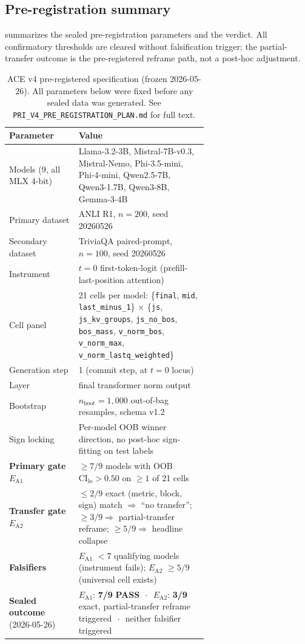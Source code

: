\documentclass[10pt, letterpaper]{article}
\newcommand{\ea}[1]{$E_{\text{A}#1}$}
\begin{document}
\subsection{Pre-registration summary}
\label{sec:results:prereg}

 summarizes the sealed pre-registration
parameters and the verdict. All confirmatory thresholds are cleared
without falsification trigger; the partial-transfer outcome is the
pre-registered reframe path, not a post-hoc adjustment.

\begin{table}[h]
\centering
\caption{ACE v4 pre-registered specification (frozen 2026-05-26).
All parameters below were fixed before any sealed data was generated.
See \texttt{PRI\_V4\_PRE\_REGISTRATION\_PLAN.md} for full text.}
\label{tab:ace_prereg_summary}
\small
\begin{tabular}{@{}lp{0.65\linewidth}@{}}
\toprule
\textbf{Parameter} & \textbf{Value} \\
\midrule
Models (9, all MLX 4-bit) & Llama-3.2-3B, Mistral-7B-v0.3, Mistral-Nemo, Phi-3.5-mini, Phi-4-mini, Qwen2.5-7B, Qwen3-1.7B, Qwen3-8B, Gemma-3-4B \\
Primary dataset & ANLI R1, $n=200$, seed 20260526 \\
Secondary dataset & TriviaQA paired-prompt, $n=100$, seed 20260526 \\
Instrument & $t{=}0$ first-token-logit (prefill-last-position attention) \\
Cell panel & 21 cells per model: \{\texttt{final}, \texttt{mid}, \texttt{last\_minus\_1}\} $\times$ \{\texttt{js}, \texttt{js\_kv\_groups}, \texttt{js\_no\_bos}, \texttt{bos\_mass}, \texttt{v\_norm\_bos}, \texttt{v\_norm\_max}, \texttt{v\_norm\_lastq\_weighted}\} \\
Generation step & 1 (commit step, at $t{=}0$ locus) \\
Layer & final transformer norm output \\
Bootstrap & $n_{\text{boot}}=1{,}000$ out-of-bag resamples, schema v1.2 \\
Sign locking & Per-model OOB winner direction, no post-hoc sign-fitting on test labels \\
\midrule
\textbf{Primary gate \ea{1}} & $\geq 7/9$ models with OOB $\text{CI}_{\text{lo}} > 0.50$ on $\geq 1$ of 21 cells \\
\textbf{Transfer gate \ea{2}} &
  $\leq 2/9$ exact (metric, block, sign) match $\Rightarrow$ ``no transfer'';
  $\geq 3/9 \Rightarrow$ partial-transfer reframe;
  $\geq 5/9 \Rightarrow$ headline collapse \\
\textbf{Falsifiers} & \ea{1} $< 7$ qualifying models (instrument fails); \ea{2} $\geq 5/9$ (universal cell exists) \\
\midrule
\textbf{Sealed outcome} (2026-05-26) & \ea{1}: \textbf{7/9} \textbf{PASS} $\,\cdot\,$ \ea{2}: \textbf{3/9} exact, partial-transfer reframe triggered $\,\cdot\,$ neither falsifier triggered \\
\bottomrule
\end{tabular}
\end{table}
\end{document}
